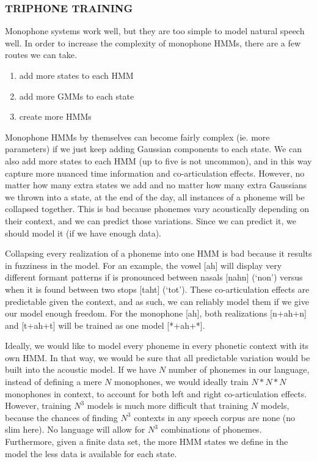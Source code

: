 \documentclass[10pt,a4paper]{article}
\begin{document}
\subsubsection*{TRIPHONE TRAINING}

Monophone systems work well, but they are too simple to model natural speech well. In order to increase the complexity of monophone HMMs, there are a few routes we can take.

\begin{enumerate}
\item add more states to each HMM
\item add more GMMs to each state
\item create more HMMs
\end{enumerate}

Monophone HMMs by themselves can become fairly complex (ie. more parameters) if we just keep adding Gaussian components to each state. We can also add more states to each HMM (up to five is not uncommon), and in this way capture more nuanced time information and co-articulation effects. However, no matter how many extra states we add and no matter how many extra Gaussians we thrown into a state, at the end of the day, all instances of a phoneme will be collapsed together. This is bad because phonemes vary acoustically depending on their context, and we can predict those variations. Since we can predict it, we should model it (if we have enough data).

Collapsing every realization of a phoneme into one HMM is bad because it results in fuzziness in the model. For an example, the vowel [ah] will display very different formant patterns if is pronounced between nasals [nahn] (`non') versus when it is found between two stops [taht] (`tot'). These co-articulation effects are predictable given the context, and as such, we can reliably model them if we give our model enough freedom. For the monophone [ah], both realizations [n+ah+n] and [t+ah+t] will be trained as one model [*+ah+*].

Ideally, we would like to model every phoneme in every phonetic context with its own HMM. In that way, we would be sure that all predictable variation would be built into the acoustic model. If we have $N$ number of phonemes in our language, instead of defining a mere $N$ monophones, we would ideally train $N*N*N$ monophones in context, to account for both left and right co-articulation effects. However, training $N^3$ models is much more difficult that training $N$ models, because the chances of finding $N^3$ contexts in any speech corpus are none (no slim here). No language will allow for $N^3$ combinations of phonemes. Furthermore, given a finite data set, the more HMM states we define in the model the less data is available for each state.
  
\end{document}
